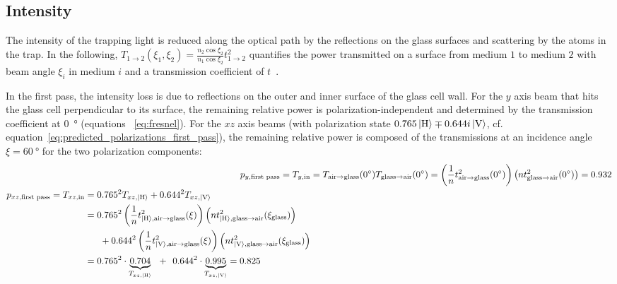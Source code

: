 \subsection*{Intensity}
The intensity of the trapping light is reduced along the optical path by the reflections on the glass surfaces and scattering by the atoms in the trap. In the following, $T_{1 \rightarrow 2}(\xi_1, \xi_2) = \frac{n_2 \cos \xi_2 }{n_1 \cos \xi_2} t_{1\rightarrow 2}^2$ quantifies the power transmitted on a surface from medium $1$ to medium $2$ with beam angle $\xi_i$ in medium $i$ and a transmission coefficient of $t$~\cite{demtroder_elektromagnetische_2013}.

In the first pass, the intensity loss is due to reflections on the outer and inner surface of the glass cell wall. For the $y$ axis beam that hits the glass cell perpendicular to its surface, the remaining relative power is polarization-independent and determined by the transmission coefficient at \SI{0}{\degree} (equations ~\ref{eq:fresnel}). For the $xz$ axis beams (with polarization state $0.765 \Ket{\text{H}} \mp 0.644i \Ket{\text{V}}$, cf. equation~\ref{eq:predicted_polarizations_first_pass}), the remaining relative power is composed of the transmissions at an incidence angle $\xi = \SI{60}{\degree}$ for the two polarization components:
\begin{align}
    p_{y, \text{first pass}} = T_{y, \text{in}} &= T_{\text{air} \rightarrow \text{glass}}(\SI{0}{\degree}) T_{\text{glass} \rightarrow \text{air}}(\SI{0}{\degree}) = \left(\frac{1}{n} t^2_{\text{air} \rightarrow \text{glass}}(\SI{0}{\degree})\right) \left(n t^2_{\text{glass} \rightarrow \text{air}}(\SI{0}{\degree})\right) = \SI{0.932}{}\\
    \begin{split}
        p_{xz, \text{first pass}} = T_{xz, \text{in}} &= 0.765^2 T_{xz, \Ket{\text{H}}} + 0.644^2 T_{xz, \Ket{\text{V}}} \\
        &=  0.765^2 \left(\frac{1}{n} t^2_{\Ket{\text{H}}, \text{air} \rightarrow \text{glass}}(\xi)\right) \left(n t^2_{\Ket{\text{H}}, \text{glass} \rightarrow \text{air}}(\xi_\text{glass})\right) \\ &~~~~~+ 0.644^2 \left(\frac{1}{n} t^2_{\Ket{\text{V}}, \text{air} \rightarrow \text{glass}}(\xi)\right) \left(n t^2_{\Ket{\text{V}}, \text{glass} \rightarrow \text{air}}(\xi_\text{glass})\right) \\
        &= 0.765^2 \cdot \underbrace{0.704}_{T_{xz, \Ket{\text{H}}}} ~~+~~ 0.644^2 \cdot \underbrace{0.995}_{T_{xz, \Ket{\text{V}}}} = 0.825
    \end{split}
\end{align}

